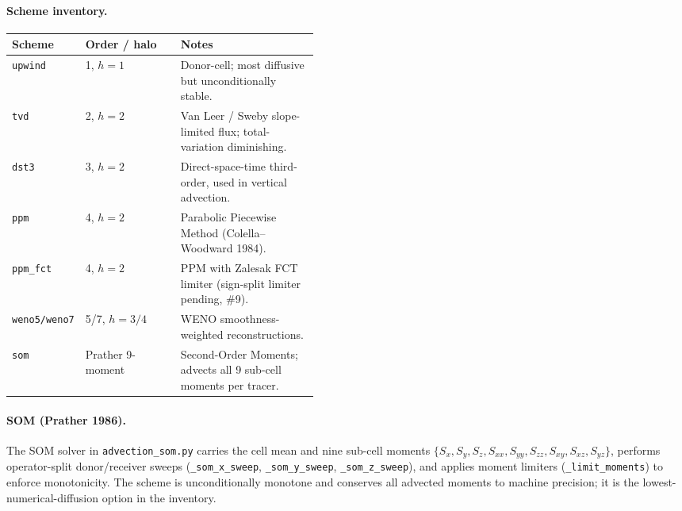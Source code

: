 \documentclass[11pt,twoside]{report}
\begin{document}
\paragraph{Scheme inventory.}
\begin{center}
\begin{tabular}{llp{0.45\linewidth}}
\toprule
Scheme & Order / halo & Notes \\
\midrule
\texttt{upwind}      & 1, $h{=}1$ & Donor-cell; most diffusive but unconditionally stable. \\
\texttt{tvd}         & 2, $h{=}2$ & Van Leer / Sweby slope-limited flux; total-variation diminishing. \\
\texttt{dst3}        & 3, $h{=}2$ & Direct-space-time third-order, used in vertical advection. \\
\texttt{ppm}         & 4, $h{=}2$ & Parabolic Piecewise Method (Colella--Woodward 1984). \\
\texttt{ppm\_fct}    & 4, $h{=}2$ & PPM with Zalesak FCT limiter (sign-split limiter pending, \#9). \\
\texttt{weno5/weno7} & 5/7, $h{=}3/4$ & WENO smoothness-weighted reconstructions. \\
\texttt{som}         & Prather 9-moment & Second-Order Moments; advects all 9 sub-cell moments per tracer. \\
\bottomrule
\end{tabular}
\end{center}

\paragraph{SOM (Prather 1986).}
The SOM solver in \texttt{advection\_som.py} carries the cell mean and
nine sub-cell moments $\{S_x, S_y, S_z, S_{xx}, S_{yy}, S_{zz},
S_{xy}, S_{xz}, S_{yz}\}$, performs operator-split donor/receiver
sweeps (\texttt{\_som\_x\_sweep}, \texttt{\_som\_y\_sweep},
\texttt{\_som\_z\_sweep}), and applies moment limiters
(\texttt{\_limit\_moments}) to enforce monotonicity.  The scheme is
unconditionally monotone and conserves all advected moments to machine
precision; it is the lowest-numerical-diffusion option in the
inventory.
\end{document}
